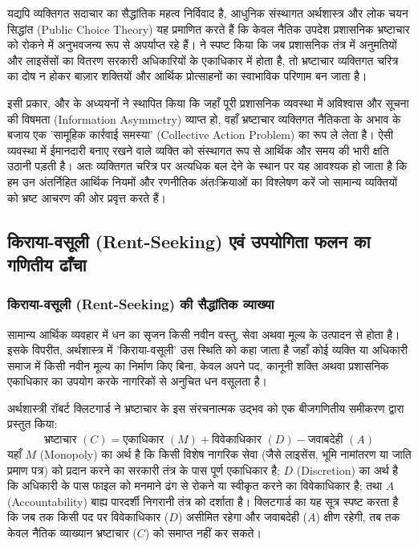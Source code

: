 \documentclass[11pt, a4paper]{article}
\begin{document}
यद्यपि व्यक्तिगत सदाचार का सैद्धांतिक महत्व निर्विवाद है, आधुनिक संस्थागत अर्थशास्त्र और लोक चयन सिद्धांत (Public Choice Theory) यह प्रमाणित करते हैं कि केवल नैतिक उपदेश प्रशासनिक भ्रष्टाचार को रोकने में अनुभवजन्य रूप से अपर्याप्त रहे हैं। \citep{shleifer1993} ने स्पष्ट किया कि जब प्रशासनिक तंत्र में अनुमतियों और लाइसेंसों का वितरण सरकारी अधिकारियों के एकाधिकार में होता है, तो भ्रष्टाचार व्यक्तिगत चरित्र का दोष न होकर बाज़ार शक्तियों और आर्थिक प्रोत्साहनों का स्वाभाविक परिणाम बन जाता है। 

इसी प्रकार, \citep{bardhan1997} और \citep{rothstein2011} के अध्ययनों ने स्थापित किया कि जहाँ पूरी प्रशासनिक व्यवस्था में अविश्वास और सूचना की विषमता (Information Asymmetry) व्याप्त हो, वहाँ भ्रष्टाचार व्यक्तिगत नैतिकता के अभाव के बजाय एक 'सामूहिक कार्रवाई समस्या' (Collective Action Problem) का रूप ले लेता है। ऐसी व्यवस्था में ईमानदारी बनाए रखने वाले व्यक्ति को संस्थागत रूप से आर्थिक और समय की भारी क्षति उठानी पड़ती है। अतः व्यक्तिगत चरित्र पर अत्यधिक बल देने के स्थान पर यह आवश्यक हो जाता है कि हम उन अंतर्निहित आर्थिक नियमों और रणनीतिक अंतःक्रियाओं का विश्लेषण करें जो सामान्य व्यक्तियों को भ्रष्ट आचरण की ओर प्रवृत्त करते हैं।

\subsection{किराया-वसूली (Rent-Seeking) एवं उपयोगिता फलन का गणितीय ढाँचा}

\subsubsection{किराया-वसूली (Rent-Seeking) की सैद्धांतिक व्याख्या}
सामान्य आर्थिक व्यवहार में धन का सृजन किसी नवीन वस्तु, सेवा अथवा मूल्य के उत्पादन से होता है। इसके विपरीत, अर्थशास्त्र में 'किराया-वसूली' उस स्थिति को कहा जाता है जहाँ कोई व्यक्ति या अधिकारी समाज में किसी नवीन मूल्य का निर्माण किए बिना, केवल अपने पद, कानूनी शक्ति अथवा प्रशासनिक एकाधिकार का उपयोग करके नागरिकों से अनुचित धन वसूलता है। 

अर्थशास्त्री रॉबर्ट क्लिटगार्ड \citep{klitgaard1988} ने भ्रष्टाचार के इस संरचनात्मक उद्भव को एक बीजगणितीय समीकरण द्वारा प्रस्तुत किया:
\begin{equation}
\text{भ्रष्टाचार } (C) = \text{एकाधिकार } (M) + \text{विवेकाधिकार } (D) - \text{जवाबदेही } (A)
\end{equation}
यहाँ $M$ (Monopoly) का अर्थ है कि किसी विशेष नागरिक सेवा (जैसे लाइसेंस, भूमि नामांतरण या जाति प्रमाण पत्र) को प्रदान करने का सरकारी तंत्र के पास पूर्ण एकाधिकार है; $D$ (Discretion) का अर्थ है कि अधिकारी के पास फाइल को मनमाने ढंग से रोकने या स्वीकृत करने का विवेकाधिकार है; तथा $A$ (Accountability) बाह्य पारदर्शी निगरानी तंत्र को दर्शाता है। क्लिटगार्ड का यह सूत्र स्पष्ट करता है कि जब तक किसी पद पर विवेकाधिकार ($D$) असीमित रहेगा और जवाबदेही ($A$) क्षीण रहेगी, तब तक केवल नैतिक व्याख्यान भ्रष्टाचार ($C$) को समाप्त नहीं कर सकते।
\end{document}
